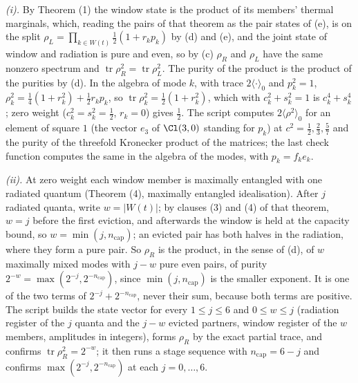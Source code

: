 \emph{(i).} By Theorem (1) the window state is the product of its members' thermal marginals, which, reading the pairs of that theorem as the pair states of (e), is on the split $\rho_{L} = \prod_{k \in W(t)}\tfrac12(1 + r_{k}p_{k})$ by (d) and (e), and the joint state of window and radiation is pure and even, so by (c) $\rho_{R}$ and $\rho_{L}$ have the same nonzero spectrum and $\operatorname{tr}\rho_{R}^{2} = \operatorname{tr}\rho_{L}^{2}$. The purity of the product is the product of the purities by (d). In the algebra of mode $k$, with trace $2\langle\cdot\rangle_{0}$ and $p_{k}^{2} = 1$, $\rho_{k}^{2} = \tfrac14(1 + r_{k}^{2}) + \tfrac12 r_{k}p_{k}$, so $\operatorname{tr}\rho_{k}^{2} = \tfrac12(1 + r_{k}^{2})$, which with $c_{k}^{2} + s_{k}^{2} = 1$ is $c_{k}^{4} + s_{k}^{4}$; zero weight ($c_{k}^{2} = s_{k}^{2} = \tfrac12$, $r_{k} = 0$) gives $\tfrac12$. The script computes $2\langle\rho^{2}\rangle_{0}$ for an element of square $1$ (the vector $e_{3}$ of $\Cl(3,0)$ standing for $p_{k}$) at $c^{2} = \tfrac12, \tfrac23, \tfrac57$ and the purity of the threefold Kronecker product of the matrices; the last check function computes the same in the algebra of the modes, with $p_{k} = f_{k}e_{k}$.

\emph{(ii).} At zero weight each window member is maximally entangled with one radiated quantum (Theorem (4), maximally entangled idealisation). After $j$ radiated quanta, write $w = |W(t)|$; by clauses (3) and (4) of that theorem, $w = j$ before the first eviction, and afterwards the window is held at the capacity bound, so $w = \min(j, n_{\mathrm{cap}})$; an evicted pair has both halves in the radiation, where they form a pure pair. So $\rho_{R}$ is the product, in the sense of (d), of $w$ maximally mixed modes with $j - w$ pure even pairs, of purity $2^{-w} = \max(2^{-j}, 2^{-n_{\mathrm{cap}}})$, since $\min(j, n_{\mathrm{cap}})$ is the smaller exponent. It is one of the two terms of $2^{-j} + 2^{-n_{\mathrm{cap}}}$, never their sum, because both terms are positive. The script builds the state vector for every $1 \leq j \leq 6$ and $0 \leq w \leq j$ (radiation register of the $j$ quanta and the $j - w$ evicted partners, window register of the $w$ members, amplitudes in integers), forms $\rho_{R}$ by the exact partial trace, and confirms $\operatorname{tr}\rho_{R}^{2} = 2^{-w}$; it then runs a stage sequence with $n_{\mathrm{cap}} = 6 - j$ and confirms $\max(2^{-j}, 2^{-n_{\mathrm{cap}}})$ at each $j = 0, \ldots, 6$.

